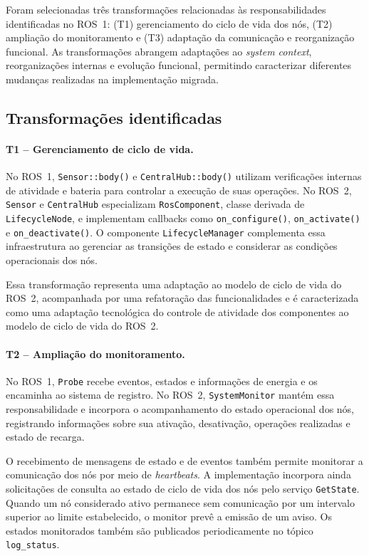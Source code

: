 Foram selecionadas três transformações relacionadas às responsabilidades identificadas no ROS~1: (T1) gerenciamento do ciclo de vida dos nós, (T2) ampliação do monitoramento e (T3) adaptação da comunicação e reorganização funcional. As transformações abrangem adaptações ao \textit{system context}, reorganizações internas e evolução funcional, permitindo caracterizar diferentes mudanças realizadas na implementação migrada.


\subsection{Transformações identificadas}
\label{subsec:res-planejamento-transformacoes}

\paragraph{T1 -- Gerenciamento de ciclo de vida.}
No ROS~1, \texttt{Sensor::body()} e \texttt{CentralHub::body()} utilizam verificações internas de atividade e bateria para controlar a execução de suas operações. No ROS~2, \texttt{Sensor} e \texttt{CentralHub} especializam \texttt{RosComponent}, classe derivada de \texttt{LifecycleNode}, e implementam callbacks como \texttt{on\_configure()}, \texttt{on\_activate()} e \texttt{on\_deactivate()}. O componente \texttt{LifecycleManager} complementa essa infraestrutura ao gerenciar as transições de estado e considerar as condições operacionais dos nós.


Essa transformação representa uma adaptação ao modelo de ciclo de vida do ROS~2, acompanhada por uma refatoração das funcionalidades e é caracterizada como uma adaptação tecnológica do controle de atividade dos componentes ao modelo de ciclo de vida do ROS~2.




\paragraph{T2 -- Ampliação do monitoramento.}

No ROS~1, \texttt{Probe} recebe eventos, estados e informações de energia e os encaminha ao sistema de registro. No ROS~2, \texttt{SystemMonitor} mantém essa responsabilidade e incorpora o acompanhamento do estado operacional dos nós, registrando informações sobre sua ativação, desativação, operações realizadas e estado de recarga.

O recebimento de mensagens de estado e de eventos também permite monitorar a comunicação dos nós por meio de \textit{heartbeats}. A implementação incorpora ainda solicitações de consulta ao estado de ciclo de vida dos nós pelo serviço \texttt{GetState}. Quando um nó considerado ativo permanece sem comunicação por um intervalo superior ao limite estabelecido, o monitor prevê a emissão de um aviso. Os estados monitorados também são publicados periodicamente no tópico \texttt{log\_status}.


